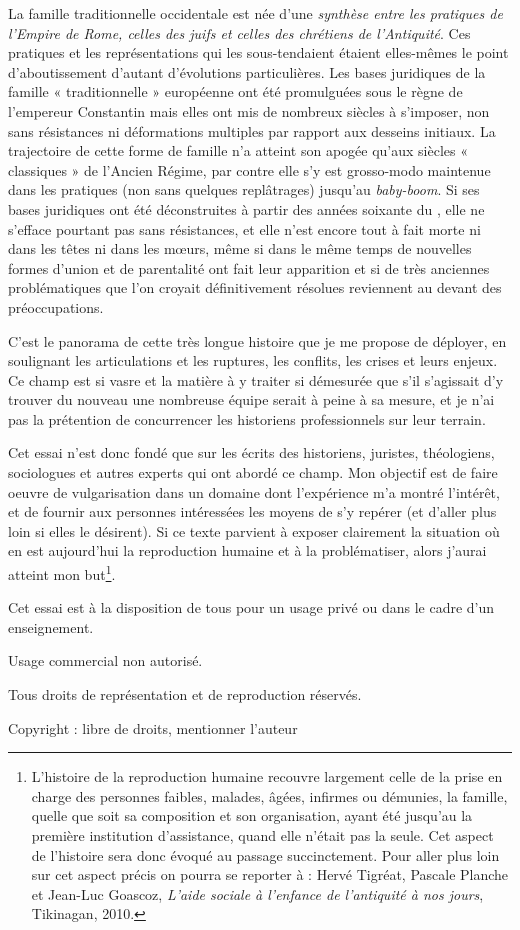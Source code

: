 La famille traditionnelle occidentale est
née d'une \emph{synthèse entre les pratiques de l'Empire de Rome, celles des
juifs et celles des chrétiens de l'Antiquité}. Ces pratiques et les représentations
qui les sous-tendaient étaient elles-mêmes le point d'aboutissement
d'autant d'évolutions particulières.
Les bases juridiques de la famille « traditionnelle » européenne ont été promulguées sous le règne
de l'empereur Constantin mais elles ont mis de nombreux
siècles à s'imposer, non sans résistances ni déformations multiples par
rapport aux desseins initiaux. La trajectoire de cette forme de famille n'a atteint son apogée qu'aux
siècles « classiques » de l'Ancien Régime, par contre elle s'y est grosso-modo maintenue dans les pratiques (non sans quelques replâtrages) jusqu'au
\emph{baby-boom}.  Si ses bases juridiques ont été déconstruites à partir des années soixante du , elle ne s'efface pourtant pas sans résistances, et elle n'est encore tout à fait morte ni dans les têtes ni dans les mœurs, même si dans le même temps de nouvelles formes d'union et de parentalité ont fait leur apparition et si de très anciennes problématiques que l'on croyait définitivement résolues reviennent au devant des préoccupations. 

C'est le panorama de cette très longue histoire que je me propose de déployer, en soulignant les articulations et les ruptures, les
conflits, les crises et leurs enjeux. Ce champ est si vasre et la matière à y traiter  si démesurée que s'il s'agissait d'y trouver du nouveau une nombreuse équipe serait à peine à sa mesure, et je n'ai pas la prétention de concurrencer les historiens professionnels sur leur terrain. 

Cet essai n'est donc fondé que sur les écrits des historiens, juristes, théologiens, sociologues et autres experts qui ont abordé ce champ. Mon objectif est de faire oeuvre de vulgarisation dans un domaine dont l'expérience m'a montré l'intérêt, et de fournir aux personnes intéressées les moyens de s'y repérer (et d'aller plus loin si elles le désirent). Si ce texte parvient à exposer clairement la situation où en est aujourd'hui la reproduction humaine et à la problématiser, alors j'aurai atteint mon but\footnote{L'histoire de la reproduction humaine recouvre largement celle
de la prise en charge des personnes faibles, malades, âgées, infirmes ou
démunies, la famille, quelle que soit sa composition et son organisation, ayant été jusqu'au  la première institution
d'assistance, quand elle n'était pas la seule. Cet aspect de l'histoire sera donc évoqué
au passage succinctement. Pour aller plus loin sur cet aspect précis on
pourra se reporter à : Hervé Tigréat, Pascale Planche et Jean-Luc Goascoz, \emph{L'aide sociale à l'enfance de l'antiquité à nos jours}, Tikinagan, 2010.}.

Cet essai est à la disposition de tous pour un usage privé ou dans le cadre d'un enseignement. 

Usage commercial non autorisé. 

Tous droits de représentation et de reproduction réservés.

Copyright : libre de droits, mentionner l'auteur


